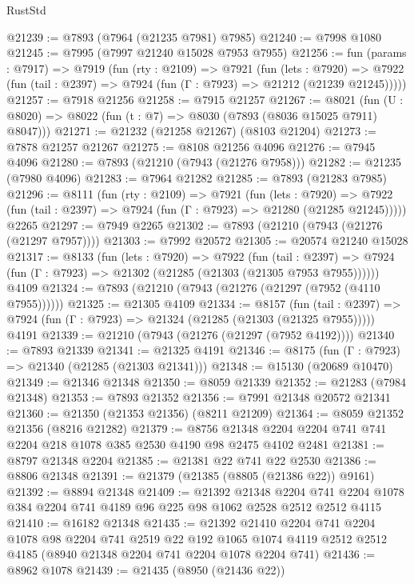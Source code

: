 \begin{lexlean}{RustStd}
\begin{coremodule}
@21239 := @7893 (@7964 (@21235 @7981) @7985)
@21240 := @7998 @1080
@21245 := @7995 (@7997 @21240 @15028 @7953 @7955)
@21256 := fun (params : @7917) =>
  @7919
    (fun (rty : @2109) =>
    @7921
      (fun (lets : @7920) =>
      @7922 (fun (tail : @2397) => @7924 (fun (Γ : @7923) => @21212 (@21239 @21245)))))
@21257 := @7918 @21256
@21258 := @7915 @21257
@21267 := @8021
    (fun (U : @8020) => @8022 (fun (t : @7) => @8030 (@7893 (@8036 @15025 @7911) @8047)))
@21271 := @21232 (@21258 @21267) (@8103 @21204)
@21273 := @7878 @21257 @21267
@21275 := @8108 @21256 @4096
@21276 := @7945 @4096
@21280 := @7893 (@21210 (@7943 (@21276 @7958)))
@21282 := @21235 (@7980 @4096)
@21283 := @7964 @21282
@21285 := @7893 (@21283 @7985)
@21296 := @8111
    (fun (rty : @2109) =>
    @7921
      (fun (lets : @7920) =>
      @7922 (fun (tail : @2397) => @7924 (fun (Γ : @7923) => @21280 (@21285 @21245)))))
    @2265
@21297 := @7949 @2265
@21302 := @7893 (@21210 (@7943 (@21276 (@21297 @7957))))
@21303 := @7992 @20572
@21305 := @20574 @21240 @15028
@21317 := @8133
    (fun (lets : @7920) =>
    @7922
      (fun (tail : @2397) =>
      @7924 (fun (Γ : @7923) => @21302 (@21285 (@21303 (@21305 @7953 @7955))))))
    @4109
@21324 := @7893 (@21210 (@7943 (@21276 (@21297 (@7952 (@4110 @7955))))))
@21325 := @21305 @4109
@21334 := @8157
    (fun (tail : @2397) => @7924 (fun (Γ : @7923) => @21324 (@21285 (@21303 (@21325 @7955)))))
    @4191
@21339 := @21210 (@7943 (@21276 (@21297 (@7952 @4192))))
@21340 := @7893 @21339
@21341 := @21325 @4191
@21346 := @8175 (fun (Γ : @7923) => @21340 (@21285 (@21303 @21341)))
@21348 := @15130 (@20689 @10470)
@21349 := @21346 @21348
@21350 := @8059 @21339
@21352 := @21283 (@7984 @21348)
@21353 := @7893 @21352
@21356 := @7991 @21348 @20572 @21341
@21360 := @21350 (@21353 @21356) (@8211 @21209)
@21364 := @8059 @21352 @21356 (@8216 @21282)
@21379 := @8756 @21348 @2204 @2204 @741 @741 @2204 @218 @1078 @385 @2530 @4190 @98 @2475 @4102 @2481
@21381 := @8797 @21348 @2204
@21385 := @21381 @22 @741 @22 @2530
@21386 := @8806 @21348
@21391 := @21379 (@21385 (@8805 (@21386 @22)) @9161)
@21392 := @8894 @21348
@21409 := @21392
    @21348
    @2204
    @741
    @2204
    @1078
    @384
    @2204
    @741
    @4189
    @96
    @225
    @98
    @1062
    @2528
    @2512
    @2512
    @4115
@21410 := @16182 @21348
@21435 := @21392
    @21410
    @2204
    @741
    @2204
    @1078
    @98
    @2204
    @741
    @2519
    @22
    @192
    @1065
    @1074
    @4119
    @2512
    @2512
    @4185
    (@8940 @21348 @2204 @741 @2204 @1078 @2204 @741)
@21436 := @8962 @1078
@21439 := @21435 (@8950 (@21436 @22))

\end{coremodule}
\end{lexlean}
